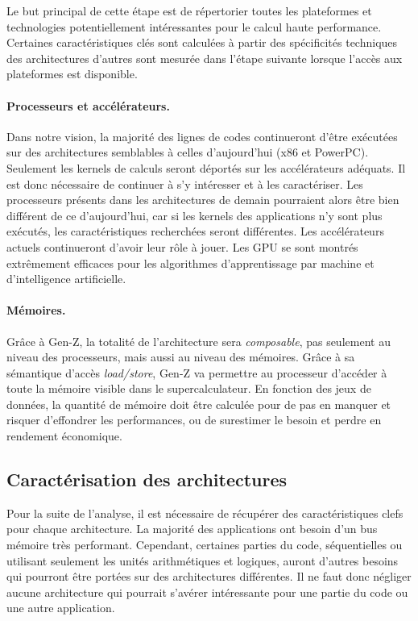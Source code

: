         Le but principal de cette étape est de répertorier toutes les plateformes et technologies potentiellement intéressantes pour le calcul haute performance. Certaines caractéristiques clés sont calculées à partir des spécificités techniques des architectures d'autres sont mesurée dans l'étape suivante lorsque l'accès aux plateformes est disponible.
    

        \paragraph{Processeurs et accélérateurs.} Dans notre vision, la majorité des lignes de codes continueront d'être exécutées sur des architectures semblables à celles d'aujourd'hui (x86 et PowerPC). Seulement les kernels de calculs seront déportés sur les accélérateurs adéquats. Il est donc nécessaire de continuer à s'y intéresser et à les caractériser. Les processeurs présents dans les architectures de demain pourraient alors être bien différent de ce d'aujourd'hui, car si les kernels des applications n'y sont plus exécutés, les caractéristiques recherchées seront différentes. Les accélérateurs actuels continueront d'avoir leur rôle à jouer. Les GPU se sont montrés extrêmement efficaces pour les algorithmes d'apprentissage par machine et d'intelligence artificielle.

        \paragraph{Mémoires.} Grâce à Gen-Z, la totalité de l'architecture sera \textit{composable}, pas seulement au niveau des processeurs, mais aussi au niveau des mémoires. Grâce à sa sémantique d'accès \textit{load/store}, Gen-Z va permettre au processeur d'accéder à toute la mémoire visible dans le supercalculateur. En fonction des jeux de données, la quantité de mémoire doit être calculée pour de pas en manquer et risquer d'effondrer les performances, ou de surestimer le besoin et perdre en rendement économique. 


\subsection{Caractérisation des architectures}

    Pour la suite de l'analyse, il est nécessaire de récupérer des caractéristiques clefs pour chaque architecture. La majorité des applications ont besoin d'un bus mémoire très performant. Cependant, certaines parties du code, séquentielles ou utilisant seulement les unités arithmétiques et logiques, auront d'autres besoins qui pourront être portées sur des architectures différentes. Il ne faut donc négliger aucune architecture qui pourrait s'avérer intéressante pour une partie du code ou une autre application. 
    
